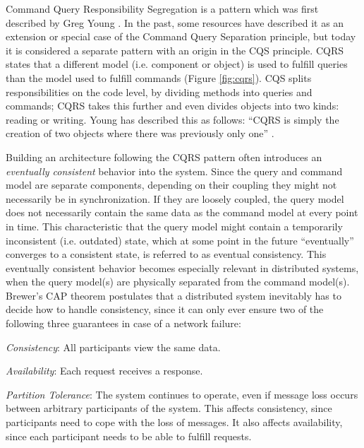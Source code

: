 Command Query Responsibility Segregation is a pattern which was first described 
by Greg Young \cite{Young2013}. In the past, some resources have described it as 
an extension or special case of the Command Query Separation principle, but today 
it is considered a separate pattern with an origin in the CQS principle. 
CQRS states that a different model (i.e. component or object) is used to fulfill 
queries than the model used to fulfill commands (Figure \ref{fig:cqrs}). CQS 
splits responsibilities on the code level, by dividing methods into queries and 
commands; CQRS takes this further and even divides objects into two kinds: 
reading or writing. Young has described this as follows: ``CQRS is simply the 
creation of two objects where there was previously only one'' \cite{Young2010}.

Building an architecture following the CQRS pattern often introduces an 
\emph{eventually consistent} behavior into the system. Since the query and 
command model are separate components, depending on their coupling they might 
not necessarily be in synchronization. 
If they are loosely coupled, the query model does not necessarily contain the 
same data as the command model at every point in time. This characteristic that 
the query model might contain a temporarily inconsistent (i.e. outdated) state, 
which at some point in the future ``eventually'' converges to a consistent state, 
is referred to as eventual consistency.
This eventually consistent behavior becomes especially relevant in distributed 
systems, when the query model(s) are physically separated from the command 
model(s). Brewer's CAP theorem \cite{Brewer1999} postulates that a distributed 
system inevitably has to decide how to handle consistency, since it can only 
ever ensure two of the following three guarantees in case of a network failure:  

\begin{compactenum}
	\item \emph{Consistency}: All participants view the same data.
	\item \emph{Availability}: Each request receives a response.
	\item \emph{Partition Tolerance}: The system continues to operate, 
	even if message loss occurs between arbitrary participants of the
	system. This affects consistency, since participants need to cope
	with the loss of messages. It also affects availability, since each
	participant needs to be able to fulfill requests.
\end{compactenum}

